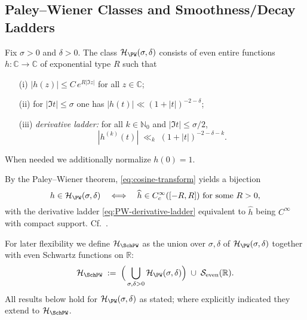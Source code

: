 \subsection{Paley–Wiener Classes and Smoothness/Decay Ladders} \label{subsec:PW-classes} %

\begin{definition} \label{def:PW-primary} %
Fix $\sigma>0$ and $\delta>0$. The class $\mathcal{H}_{\PW}(\sigma,\delta)$ consists of even entire functions $h:\mathbb C\to\mathbb C$ of exponential type $R$ such that %
\begin{enumerate}
  \item[\textnormal{(i)}] $|h(z)|\le C\,e^{R|\Im z|}$ for all $z\in\mathbb C$; %
  \item[\textnormal{(ii)}] for $|\Im t|\le \sigma$ one has $|h(t)|\ll (1+|t|)^{-2-\delta}$; %
  \item[\textnormal{(iii)}] \emph{derivative ladder:} for all $k\in\mathbb N_0$ and $|\Im t|\le \sigma/2$, %
  \begin{equation}\label{eq:PW-derivative-ladder}
    |h^{(k)}(t)| \;\ll_k\; (1+|t|)^{-2-\delta-k}. %
  \end{equation}
\end{enumerate}
When needed we additionally normalize $h(0)=1$. \qedhere %
\end{definition}

\begin{remark} %
By the Paley–Wiener theorem, \eqref{eq:cosine-transform} yields a bijection
\[
  h \in \mathcal{H}_{\PW}(\sigma,\delta) 
  \quad\Longleftrightarrow\quad 
  \widehat{h}\in C_c^\infty([-R,R]) \text{ for some $R>0$}, %
\]
with the derivative ladder \eqref{eq:PW-derivative-ladder} equivalent to $\widehat{h}$ being $C^\infty$ with compact support. Cf.\ \cite{PaleyWiener1934, HormanderI}. %
\end{remark}

\begin{definition} \label{def:PW-Schwartz} %
For later flexibility we define $\mathcal{H}_{\SchPW}$ as the union over $\sigma,\delta$ of $\mathcal{H}_{\PW}(\sigma,\delta)$ together with even Schwartz functions on $\mathbb R$:
\[
  \mathcal{H}_{\SchPW}\;:=\;\Big(\bigcup_{\sigma,\delta>0}\mathcal{H}_{\PW}(\sigma,\delta)\Big)\;\cup\;\mathcal{S}_{\mathrm{even}}(\mathbb R). %
\]
All results below hold for $\mathcal{H}_{\PW}(\sigma,\delta)$ as stated; where explicitly indicated they extend to $\mathcal{H}_{\SchPW}$. %
\end{definition}


